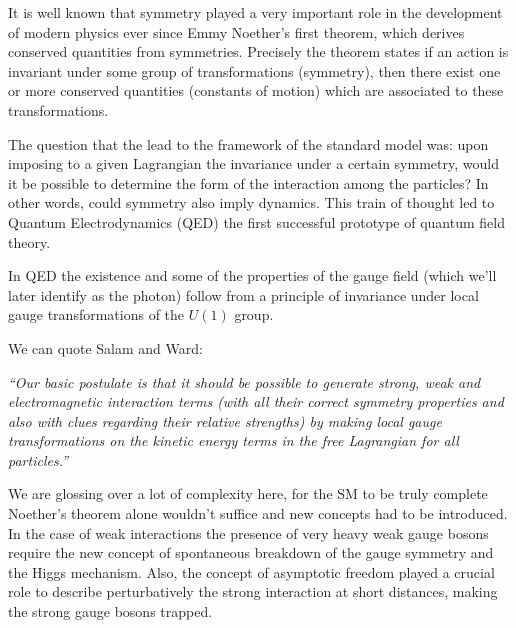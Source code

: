 It is well known that symmetry played a very important role in the development of modern physics ever since Emmy Noether's first theorem, which derives conserved quantities from symmetries. Precisely the theorem states if an action is invariant under some group of transformations (symmetry), then there exist one or more conserved quantities (constants of motion) which are associated to these transformations. 

The question that the lead to the framework of the standard model was:  upon imposing to a given Lagrangian the invariance under a certain symmetry, would it be possible to determine the form of the interaction among the particles? In other words, could symmetry also imply dynamics. This train of thought led to Quantum Electrodynamics (QED) the first successful prototype of quantum field theory.

In QED the existence and some of the properties of the gauge field (which we'll later identify as the photon) follow from a principle of invariance under local gauge transformations of the $U(1)$ group.

We can quote Salam and Ward: %

\textit{“Our basic postulate is that it should be possible to generate strong,  weak and electromagnetic  interaction terms (with all their correct symmetry properties and also with clues regarding their relative strengths) by making local gauge transformations on the kinetic energy terms in the free Lagrangian for all particles.”}

We are glossing over a lot of complexity here, for the SM to be truly  complete Noether's theorem alone wouldn't suffice and new concepts had to be introduced. In the case of weak interactions the presence of very heavy weak gauge bosons require the new concept of spontaneous breakdown  of  the  gauge  symmetry and  the Higgs  mechanism. 
%
Also, the  concept  of  asymptotic  freedom 
% 
played a crucial role to describe perturbatively the strong interaction at short distances, making the strong gauge bosons trapped. 

